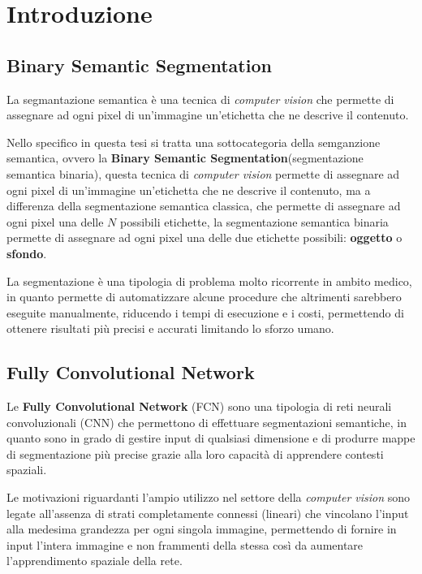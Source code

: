 

\section{Introduzione}


\subsection{Binary Semantic Segmentation}

La segmantazione semantica è una tecnica di \textit{computer vision} che permette di assegnare ad ogni pixel di un'immagine un'etichetta che ne descrive il contenuto.

Nello specifico in questa tesi si tratta una sottocategoria della semganzione semantica,
ovvero la \textbf{Binary Semantic Segmentation}(segmentazione semantica
binaria), questa tecnica di \textit{computer vision} permette di assegnare ad ogni pixel
di un'immagine un'etichetta che ne descrive il contenuto, ma a differenza della
segmentazione semantica classica, che permette di assegnare ad ogni pixel una delle $N$
possibili etichette, la segmentazione semantica binaria permette di assegnare ad ogni
pixel una delle due etichette possibili: \textbf{oggetto} o \textbf{sfondo}.

La segmentazione \`e una tipologia di problema molto ricorrente in ambito medico,
in quanto permette di automatizzare alcune procedure che altrimenti sarebbero
eseguite manualmente, riducendo i tempi di esecuzione e i costi,
permettendo di ottenere risultati pi\`u precisi e accurati limitando lo sforzo umano.


\subsection{Fully Convolutional Network}

Le \textbf{Fully Convolutional Network} (FCN) \cite{long2015fully} sono una tipologia di reti neurali convoluzionali (CNN) che permettono di effettuare segmentazioni semantiche, in quanto sono in grado di gestire input di qualsiasi dimensione e di produrre mappe di segmentazione pi\`u precise grazie alla loro capacit\`a di apprendere contesti spaziali.

Le motivazioni riguardanti l'ampio utilizzo nel settore della \textit{computer vision}
sono legate all'assenza di strati completamente connessi (lineari) che vincolano
l'input alla medesima grandezza per ogni singola immagine, permettendo di fornire in input l'intera immagine e non frammenti della stessa così da aumentare l'apprendimento spaziale della rete.

